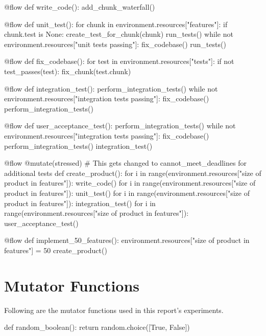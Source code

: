 \begin{appendices}
\begin{pyglist}[language = python, caption={Flows used to test the Waterfall methodology}, listingname=\textbf{Code Listing} \comment{, fvset={frame=single,framerule=1pt}}, numbers=left]
@flow
def write_code():
    add_chunk_waterfall()


@flow
def unit_test():
    for chunk in environment.resources["features"]:
        if chunk.test is None: create_test_for_chunk(chunk)
    run_tests()
    while not environment.resources["unit tests passing"]:
        fix_codebase()
        run_tests()


@flow
def fix_codebase():
    for test in environment.resources["tests"]:
        if not test_passes(test):
            fix_chunk(test.chunk)


@flow
def integration_test():
    perform_integration_tests()
    while not environment.resources["integration tests passing"]:
        fix_codebase()
        perform_integration_tests()


@flow
def user_acceptance_test():
    perform_integration_tests()
    while not environment.resources["integration tests passing"]:
        fix_codebase()
        perform_integration_tests()
        integration_test()


@flow
@mutate(stressed) # This gets changed to cannot_meet_deadlines for additional tests
def create_product():
    for i in range(environment.resources["size of product in features"]):
        write_code()
    for i in range(environment.resources["size of product in features"]):
        unit_test()
    for i in range(environment.resources["size of product in features"]):
        integration_test()
    for i in range(environment.resources["size of product in features"]):
        user_acceptance_test()


@flow
def implement_50_features():
    environment.resources["size of product in features"] = 50
    create_product()
\end{pyglist}

\chapter{Mutator Functions}
\label{appendix:mutator_functions}
Following are the mutator functions used in this report's experiments.\par

\begin{pyglist}[language = python, caption={Mutator functions used in experiments}, listingname=\textbf{Code Listing} \comment{, fvset={frame=single,framerule=1pt}}, numbers=left]
def random_boolean():
    return random.choice([True, False])



\end{pyglist}
\end{appendices}
